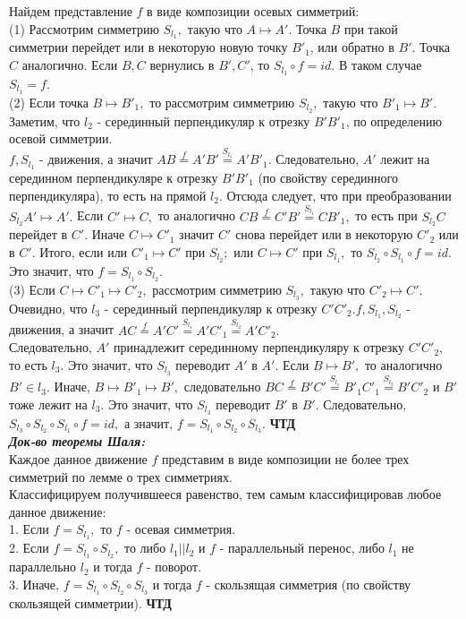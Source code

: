 \documentclass[12pt, oneside]{book}
\theoremstyle{definition}
\begin{document}
\begin{enumerate}
Найдем представление $f$ в виде композиции осевых симметрий: \\
(1) Рассмотрим симметрию $S_{l_1},$ такую что $A \mapsto A'.$ Точка $B$ при такой симметрии перейдет или в некоторую новую точку $B'_1$, или обратно в $B'$. Точка $C$ аналогично. Если $B, C$ вернулись в $B', C'$, то $S_{l_1} \circ f = id.$ В таком случае $S_{l_1} = f$. \\
(2) Если точка $B \mapsto B'_1,$ то рассмотрим симметрию $S_{l_2},$ такую что $B'_1 \mapsto B'.$ Заметим, что $l_2$ - серединный перпендикуляр к отрезку $B' B'_1$, по определению осевой симметрии. \\
$f, S_{l_1}$ - движения, а значит $AB \overset{f}{=} A'B' \overset{S_{l_1}}{=} A'B'_1.$ Следовательно, $A'$ лежит на серединном перпендикуляре к отрезку $B'B'_1$ (по свойству серединного перпендикуляра), то есть на прямой $l_2$. Отсюда следует, что при преобразовании $S_{l_2} A' \mapsto A'.$ Если $C' \mapsto C,$ то аналогично $CB \overset{f}{=} C'B' \overset{S_{l_1}}{=} CB'_1,$ то есть при $S_{l_2} C$ перейдет в $C'.$ Иначе $C \mapsto C'_1$ значит $C'$ снова перейдет или в некоторую $C'_2$ или в $C'.$ Итого, если или $C'_1 \mapsto C'$ при $S_{l_2};$ или $C \mapsto C'$ при $S_{l_1},$ то $S_{l_2} \circ S_{l_1} \circ f = id.$ Это значит, что $f = S_{l_1} \circ S_{l_2}.$ \\
(3) Если $C \mapsto C'_1 \mapsto C'_2,$ рассмотрим симметрию $S_{l_3},$ такую что $C'_2 \mapsto C'.$\\
Очевидно, что $l_3$ - серединный перпендикуляр к отрезку $C' C'_2. f, S_{l_1}, S_{l_2}$ - движения, а значит $AC \overset{f}{=} A'C' \overset{S_{l_1}}{=} A'C'_1 \overset{S_{l_2}}{=} A'C'_2.$\\
Следовательно, $A'$ принадлежит серединному перпендикуляру к отрезку $C'C'_2,$ то есть $l_3$. Это значит, что $S_{l_3}$ переводит $A'$ в $A'.$ Если $B \mapsto B',$ то аналогично $B' \in l_3.$ Иначе, $B \mapsto B'_1 \mapsto B',$ следовательно $BC \overset{f}{=} B'C' \overset{S_{l_1}}{=} B'_1C'_1 \overset{S_{l_2}}{=} B'C'_2$ и $B'$ тоже лежит на $l_3$. Это значит, что $S_{l_3}$ переводит $B'$ в $B'.$ Следовательно, $S_{l_3} \circ S_{l_2} \circ S_{l_1} \circ f = id,$ а значит, $f = S_{l_1} \circ S_{l_2} \circ S_{l_3}.$ \textbf{ЧТД}\\
\textit{\textbf{Док-во теоремы Шаля:}}\\
Каждое данное движение $f$ представим в виде композиции не более трех симметрий по лемме о трех симметриях. \\
Классифицируем получившееся равенство, тем самым классифицировав любое данное движение:\\
1. Если $f = S_{l_1},$ то $f$ - осевая симметрия.\\
2. Если $f = S_{l_1} \circ S_{l_2},$ то либо $l_1 || l_2$ и $f$ - параллельный перенос, либо $l_1$ не параллельно $l_2$ и тогда $f$ - поворот.\\
3. Иначе, $f = S_{l_1} \circ S_{l_2} \circ S_{l_3}$ и тогда $f$ - скользящая симметрия (по свойству скользящей симметрии). \textbf{ЧТД} \\




\end{enumerate}
\end{document}
